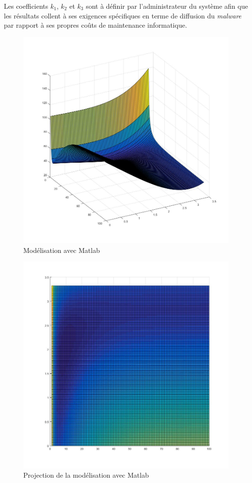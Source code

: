 Les coefficients $k_1$, $k_2$ et $k_3$ sont à définir par l'administrateur du système afin que les résultats collent à ses exigences spécifiques en terme de diffusion du \textit{malware} par rapport à ses propres coûts de maintenance informatique.

\begin{figure}[ht]
\centering
     \includegraphics[width=1.0\linewidth]{Paul/Matlab/3D.jpg}
     \caption{Modélisation avec Matlab}
     \label{normal_case}
\end{figure}

\begin{figure}[ht]
\centering
     \includegraphics[width=1.0\linewidth]{Paul/Matlab/3D_proj.jpg}
     \caption{Projection de la modélisation avec Matlab}
     \label{normal_case}
\end{figure}

